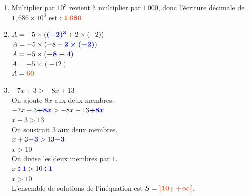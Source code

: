 \documentclass[a4paper,11pt]{article}
\begin{document}
\begin{seance}{}
\begin{enumerate}
\begin{tikzpicture}[baseline,scale = 0.75]
\end{tikzpicture}

\item Multiplier par  $10^{3}$ revient à multiplier par $1\,000$,  donc l'écriture décimale de $1{,}686\times 10^{3}$ est : ${\color[HTML]{f15929}\boldsymbol{1\,686}}$.
\item  $A            =-5 \times ( {\color{blue}\boldsymbol{(-2)^3}} +2\times(-2))$\\$A=-5 \times ( -8 + {\color{blue}\boldsymbol{2\times(-2)}})$\\$A=-5\times ( {\color{blue}\boldsymbol{-8-4}})$\\$A=-5\times (-12)$\\$A = {\color[HTML]{f15929}\boldsymbol{60}}$
\item  $-7x+3> -8x+13$\\On ajoute $8x$ aux deux membres.\\$-7x+3{\color{blue}\boldsymbol{+8x}}
          >-8x+13{\color{blue}\boldsymbol{+8x}}$\\$x+3>13$\\On soustrait $3$ aux deux membres.\\$x+3{\color{blue}\boldsymbol{-3}}
          >13{\color{blue}\boldsymbol{-3}}$\\$x>10$\\On divise les deux membres par $1$.\\$x{\color{blue}\boldsymbol{\div1}}
            >10{\color{blue}\boldsymbol{\div1}}$\\$x>10$\\ L'ensemble de solutions de l'inéquation est $S = {\color[HTML]{f15929}\boldsymbol{\left]10\,;\,+\infty\right[}}$.
\end{enumerate}
\end{seance}
\end{document}
